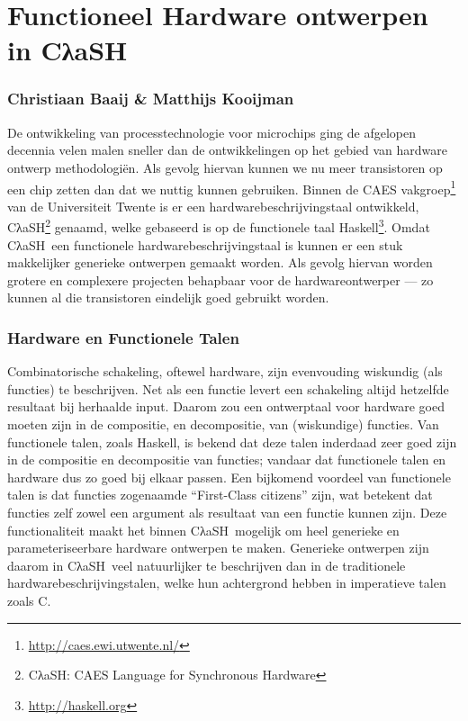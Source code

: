 \documentclass{paper}
\newcommand{\clash}{CλaSH}
\begin{document}
\pagestyle{empty}
\section*{Functioneel Hardware ontwerpen in \clash}
\subsubsection*{Christiaan Baaij \& Matthijs Kooijman}

De ontwikkeling van processtechnologie voor microchips ging de afgelopen decennia velen malen sneller dan de ontwikkelingen op het gebied van hardware ontwerp methodologi\"{e}n. 
Als gevolg hiervan kunnen we nu meer transistoren op een chip zetten dan dat we nuttig kunnen gebruiken.
Binnen de CAES vakgroep\footnote{\url{http://caes.ewi.utwente.nl/}} van de Universiteit Twente is er een hardwarebeschrijvingstaal ontwikkeld, \clash\footnote{\clash: CAES Language for Synchronous Hardware} genaamd, welke gebaseerd is op de functionele taal Haskell\footnote{\url{http://haskell.org}}.
Omdat \clash\ een functionele hardwarebeschrijvingstaal is kunnen er een stuk makkelijker generieke ontwerpen gemaakt worden.
Als gevolg hiervan worden grotere en complexere projecten behapbaar voor de hardwareontwerper --- zo kunnen al die transistoren eindelijk goed gebruikt worden.

\subsubsection*{Hardware en Functionele Talen}
Combinatorische schakeling, oftewel hardware, zijn evenvouding wiskundig (als functies) te beschrijven. 
Net als een functie levert een schakeling altijd hetzelfde resultaat bij herhaalde input.
Daarom zou een ontwerptaal voor hardware goed moeten zijn in de compositie, en decompositie, van (wiskundige) functies.
Van functionele talen, zoals Haskell, is bekend dat deze talen inderdaad zeer goed zijn in de compositie en decompositie van functies; vandaar dat functionele talen en hardware dus zo goed bij elkaar passen.
Een bijkomend voordeel van functionele talen is dat functies zogenaamde ``First-Class citizens'' zijn, wat betekent dat functies zelf zowel een argument als resultaat van een functie kunnen zijn.
Deze functionaliteit maakt het binnen \clash\ mogelijk om heel generieke en parameteriseerbare hardware ontwerpen te maken.
Generieke ontwerpen zijn daarom in \clash\ veel natuurlijker te beschrijven dan in de traditionele hardwarebeschrijvingstalen, welke hun achtergrond hebben in imperatieve talen zoals C.
\end{document}
